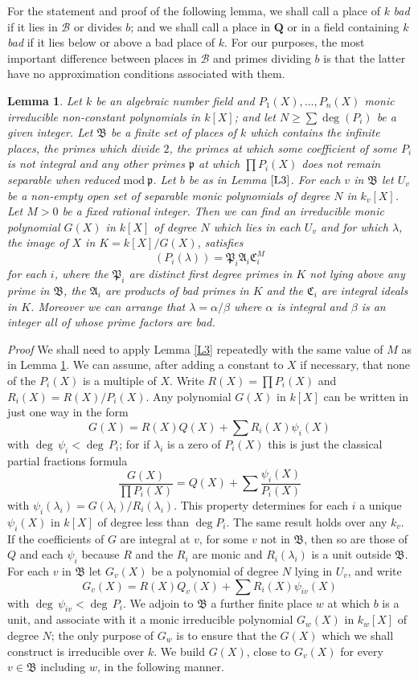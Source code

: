 \documentclass[12pt]{article}
\def\bQ{{\mathbf Q}}
\def\fA{{\mathfrak A}}
\def\fB{{\mathfrak B}}
\def\fC{{\mathfrak C}}
\def\fp{{\mathfrak p}}
\def\fP{{\mathfrak P}}
\def\ga{{\alpha}}
\def\gb{{\beta}}
\def\gl{{\lambda}}
\def\sB{{\mathcal B}}
\def\beq{\begin{equation} \label}
\def\ble{\begin{lemma} \label}
\def\ele{\end{lemma}}
\newtheorem{lemma}{Lemma}
\begin{document}
For the statement and proof of the following lemma, we shall call a place of
$k$ \emph{bad} if it lies in $\sB$ or divides $b$; and we shall call a place
in $\bQ$ or in a field containing $k$ \emph{bad} if it lies below or above a
bad place of $k$. For our purposes, the most important difference between
places in $\sB$ and primes dividing $b$ is that the latter have no
approximation conditions associated with them.
\ble{L2} Let $k$ be an algebraic number field and $P_1(X),\ldots,P_n(X)$
monic irreducible non-constant
polynomials in $k[X]$; and let $N\geq\sum\deg(P_i)$ be a
given integer. Let $\fB$ be a finite set of places of $k$ which contains the
infinite places, the primes which divide $2$,
the primes at which some coefficient of some $P_i$ is not integral and
any other primes $\fp$ at which $\prod P_i(X)$ does not remain separable
when reduced ${\mathrm{mod~}}\fp$. Let $b$ be as in Lemma $\ref{L3}$.
For each $v$ in $\fB$ let $U_v$ be a
non-empty open set of separable monic polynomials of degree $N$ in $k_v[X]$.
Let $M>0$ be a fixed rational integer.
Then we can find an irreducible monic polynomial
$G(X)$ in $k[X]$ of degree $N$ which lies in each $U_v$ and for which
$\gl$, the image of $X$ in $K=k[X]/G(X)$, satisfies
\beq{E12} (P_i(\gl))=\fP_i\fA_i\fC_i^M \end{equation}
for each $i$, where the $\fP_i$ are distinct first degree primes in $K$ not
lying above any prime in $\fB$, the $\fA_i$ are products of bad primes in $K$
and the $\fC_i$ are integral ideals in $K$.
Moreover we can arrange that
$\gl=\ga/\gb$ where $\ga$ is integral and $\gb$ is an integer all of whose 
prime factors are bad.
\ele
\emph{Proof} We shall need to apply Lemma \ref{L3} repeatedly with
the same value of $M$ as in Lemma \ref{L2}.
We can assume, after adding a constant to $X$ if necessary, that
none of the $P_i(X)$ is a multiple of $X$.
Write $R(X)=\prod P_i(X)$ and $R_i(X)=R(X)/P_i(X)$. Any polynomial
$G(X)$ in $k[X]$ can be written in just one way in the form
\beq{E2} G(X)=R(X)Q(X)+\sum R_i(X)\psi_i(X) \end{equation}
with $\deg\,\psi_i<\deg\,P_i$; for if $\gl_i$ is a zero of $P_i(X)$ this is
just the classical partial fractions formula
\[ \frac{G(X)}{\prod P_i(X)}=Q(X)+\sum\frac{\psi_i(X)}{P_i(X)} \]
with $\psi_i(\gl_i)=G(\gl_i)/R_i(\gl_i)$. This property
determines for each $i$ a unique
$\psi_i(X)$ in $k[X]$ of degree less than $\deg P_i$. The same result holds
over any $k_v$. If
the coefficients of $G$ are integral at $v$, for some $v$ not in $\fB$, then
so are those of $Q$ and each $\psi_i$ because $R$ and the $R_i$ are monic and
$R_i(\gl_i)$ is a unit outside $\fB$. For
each $v$ in $\fB$ let $G_v(X)$ be a polynomial of degree $N$ lying
in $U_v$, and write
\[ G_v(X)=R(X)Q_v(X)+\sum R_i(X)\psi_{iv}(X) \]
with $\deg\,\psi_{iv}<\deg\,P_i$. We adjoin to $\fB$ a further finite place $w$
at which $b$ is a unit, and associate with it a monic irreducible
polynomial $G_w(X)$ in $k_w[X]$ of 
degree $N$; the only purpose of $G_w$ is to ensure that the $G(X)$ which we
shall construct is irreducible over $k$. We build $G(X)$, close to
$G_v(X)$ for every $v\in\fB$ including $w$, in the following manner.
\end{document}
